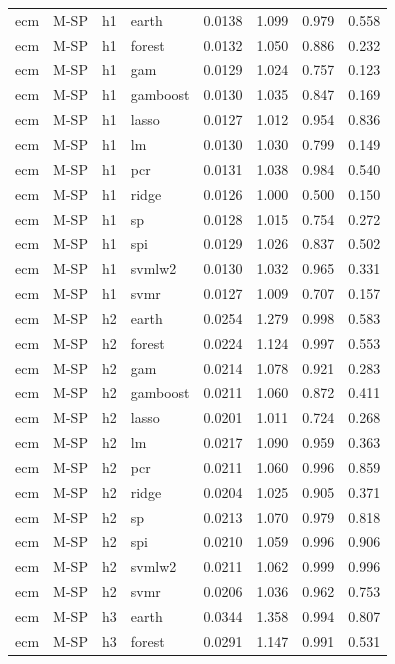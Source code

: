 \begin{ThreePartTable}
\begin{longtable}[t]{llclcccc}
\addlinespace
ecm & M-SP & h1 & earth & 0.0138 & 1.099 & 0.979 & 0.558\\
ecm & M-SP & h1 & forest & 0.0132 & 1.050 & 0.886 & 0.232\\
ecm & M-SP & h1 & gam & 0.0129 & 1.024 & 0.757 & 0.123\\
ecm & M-SP & h1 & gamboost & 0.0130 & 1.035 & 0.847 & 0.169\\
ecm & M-SP & h1 & lasso & 0.0127 & 1.012 & 0.954 & 0.836\\
ecm & M-SP & h1 & lm & 0.0130 & 1.030 & 0.799 & 0.149\\
ecm & M-SP & h1 & pcr & 0.0131 & 1.038 & 0.984 & 0.540\\
ecm & M-SP & h1 & ridge & 0.0126 & 1.000 & 0.500 & 0.150\\
ecm & M-SP & h1 & sp & 0.0128 & 1.015 & 0.754 & 0.272\\
ecm & M-SP & h1 & spi & 0.0129 & 1.026 & 0.837 & 0.502\\
ecm & M-SP & h1 & svmlw2 & 0.0130 & 1.032 & 0.965 & 0.331\\
ecm & M-SP & h1 & svmr & 0.0127 & 1.009 & 0.707 & 0.157\\
\addlinespace
ecm & M-SP & h2 & earth & 0.0254 & 1.279 & 0.998 & 0.583\\
ecm & M-SP & h2 & forest & 0.0224 & 1.124 & 0.997 & 0.553\\
ecm & M-SP & h2 & gam & 0.0214 & 1.078 & 0.921 & 0.283\\
ecm & M-SP & h2 & gamboost & 0.0211 & 1.060 & 0.872 & 0.411\\
ecm & M-SP & h2 & lasso & 0.0201 & 1.011 & 0.724 & 0.268\\
ecm & M-SP & h2 & lm & 0.0217 & 1.090 & 0.959 & 0.363\\
ecm & M-SP & h2 & pcr & 0.0211 & 1.060 & 0.996 & 0.859\\
ecm & M-SP & h2 & ridge & 0.0204 & 1.025 & 0.905 & 0.371\\
ecm & M-SP & h2 & sp & 0.0213 & 1.070 & 0.979 & 0.818\\
ecm & M-SP & h2 & spi & 0.0210 & 1.059 & 0.996 & 0.906\\
ecm & M-SP & h2 & svmlw2 & 0.0211 & 1.062 & 0.999 & 0.996\\
ecm & M-SP & h2 & svmr & 0.0206 & 1.036 & 0.962 & 0.753\\
\addlinespace
ecm & M-SP & h3 & earth & 0.0344 & 1.358 & 0.994 & 0.807\\
ecm & M-SP & h3 & forest & 0.0291 & 1.147 & 0.991 & 0.531\\

\end{longtable}
\end{ThreePartTable}
